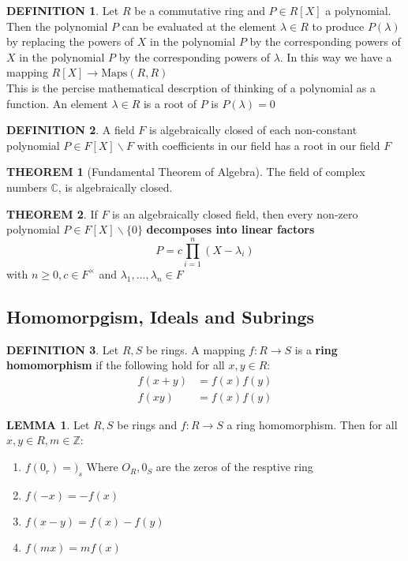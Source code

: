 \documentclass[10pt]{article}
\theoremstyle{definition}
\newtheorem{definition}{DEFINITION}[subsection]
\newtheorem{theorem}{THEOREM}[subsection]
\newcommand{\Maps}{\text{Maps}}
\newtheorem{lemma}{LEMMA}[subsection]
\begin{document}
\begin{definition}
    Let $R$ be a commutative ring and $P\in R[X]$ a polynomial. Then the polynomial $P$ can be evaluated at the element $\lambda \in R$ to produce $P(\lambda)$ by replacing the powers of $X$ in the polynomial $P$ by the corresponding powers of $X$ in the polynomial $P$ by the corresponding powers of $\lambda$. In this way we have a mapping $R[X]\rightarrow\Maps(R,R)$\\This is the percise mathematical descrption of thinking of a polynomial as a function. An element $\lambda \in R$ is a root of $P$ is $P(\lambda) = 0$
\end{definition}

\begin{definition}
    A field $F$ is algebraically closed of each non-constant polynomial $P \in F[X]\backslash F$ with coefficients in our field has a root in our field $F$
\end{definition}

\begin{theorem}[Fundamental Theorem of Algebra]
    The field of complex numbers $\mathbb{C}$, is algebraically closed.
\end{theorem}

\begin{theorem}
    If $F$ is an algebraically closed field, then every non-zero polynomial $P\in F[X]\backslash\{0\}$ \textbf{decomposes into linear factors}
    $$P = c\prod_{i=1}^n{(X-\lambda_i)}$$
    with $n \geq 0, c\in F^\times$ and $\lambda_1,...,\lambda_n\in F$
\end{theorem}

\subsection{Homomorpgism, Ideals and Subrings}
\begin{definition}
    Let $R,S$ be rings. A mapping $f:R\rightarrow S$ is a \textbf{ring homomorphism} if the following hold for all $x,y \in R$:
    \[\begin{split}
        f(x+y) &= f(x)f(y)\\
        f(xy) &= f(x)f(y)
    \end{split}\]
\end{definition}

\begin{lemma}
    Let $R,S$ be rings and $f:R\rightarrow S$ a ring homomorphism. Then for all $x,y\in R, m\in \mathbb{Z}$:
    \begin{enumerate}
        \item $f(0_r) = )_s$ Where $O_R,0_S$ are the zeros of the resptive ring
        \item $f(-x) = -f(x)$
        \item $f(x-y) = f(x) - f(y)$
        \item $f(mx) = mf(x)$
    \end{enumerate}
\end{lemma}
\end{document}
